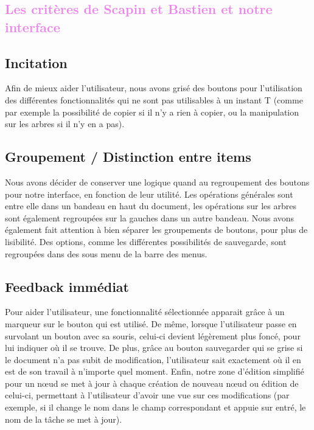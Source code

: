 \documentclass[12pt, a4paper]{article}
\begin{document}
\textcolor{Violet}{\section{Les critères de Scapin et Bastien et notre interface}}

\textcolor{NavyBlue}{\subsection{Incitation}}

Afin de mieux aider l'utilisateur, nous avons grisé des boutons pour l'utilisation des différentes fonctionnalités qui ne sont pas utilisables à un instant T (comme par exemple la possibilité de copier si il n'y a rien à copier, ou la manipulation sur les arbres si il n'y en a pas). 

\textcolor{NavyBlue}{\subsection{Groupement / Distinction entre items}}

Nous avons décider de conserver une logique quand au regroupement des boutons pour notre interface, en fonction de leur utilité. Les opérations générales sont entre elle dans un bandeau en haut du document, les opérations sur les arbres sont également regroupées sur la gauches dans un autre bandeau. Nous avons également fait attention à bien séparer les groupements de boutons, pour plus de lisibilité. Des options, comme les différentes possibilités de sauvegarde, sont regroupées dans des sous menu de la barre des menus.

\newpage
\textcolor{NavyBlue}{\subsection{Feedback immédiat}}

Pour aider l'utilisateur, une fonctionnalité sélectionnée apparait grâce à un marqueur sur le bouton qui est utilisé. De même, lorsque l'utilisateur passe en survolant un bouton avec sa souris, celui-ci devient légèrement plus foncé, pour lui indiquer où il se trouve. De plus, grâce au bouton sauvegarder qui se grise si le document n'a pas subit de modification, l'utilisateur sait exactement où il en est de son travail à n'importe quel moment. Enfin, notre zone d'édition simplifié pour un nœud se met à jour à chaque création de nouveau nœud ou édition de celui-ci, permettant à l'utilisateur d'avoir une vue sur ces modifications (par exemple, si il change le nom dans le champ correspondant et appuie sur entré, le nom de la tâche se met à jour).
\end{document}
